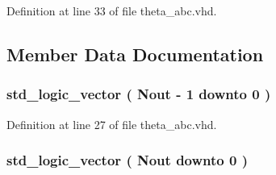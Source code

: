 Definition at line 33 of file theta\+\_\+abc.\+vhd.



\subsection{Member Data Documentation}
\hypertarget{classtheta__abc_1_1theta__abc_ad76995fdeaec7ada621075ea6562c673}{}
\subsubsection[{th\+\_\+a}]{ {\bfseries \textcolor{comment}{std\+\_\+logic\+\_\+vector}\textcolor{vhdlchar}{ }\textcolor{vhdlchar}{(}\textcolor{vhdlchar}{ }\textcolor{vhdlchar}{ }\textcolor{vhdlchar}{ }\textcolor{vhdlchar}{ }{\bfseries {\bf Nout}} \textcolor{vhdlchar}{-\/}\textcolor{vhdlchar}{ } \textcolor{vhdldigit}{1} \textcolor{vhdlchar}{ }\textcolor{keywordflow}{downto}\textcolor{vhdlchar}{ }\textcolor{vhdlchar}{ } \textcolor{vhdldigit}{0} \textcolor{vhdlchar}{ }\textcolor{vhdlchar}{)}\textcolor{vhdlchar}{ }} \hspace{0.3cm}{\ttfamily [Signal]}}\label{classtheta__abc_1_1theta__abc_ad76995fdeaec7ada621075ea6562c673}


Definition at line 27 of file theta\+\_\+abc.\+vhd.

\hypertarget{classtheta__abc_1_1theta__abc_aa089585a137a873b884793531ca5edc0}{}
\subsubsection[{th\+\_\+ai}]{ {\bfseries \textcolor{comment}{std\+\_\+logic\+\_\+vector}\textcolor{vhdlchar}{ }\textcolor{vhdlchar}{(}\textcolor{vhdlchar}{ }\textcolor{vhdlchar}{ }\textcolor{vhdlchar}{ }\textcolor{vhdlchar}{ }{\bfseries {\bf Nout}} \textcolor{vhdlchar}{ }\textcolor{keywordflow}{downto}\textcolor{vhdlchar}{ }\textcolor{vhdlchar}{ } \textcolor{vhdldigit}{0} \textcolor{vhdlchar}{ }\textcolor{vhdlchar}{)}\textcolor{vhdlchar}{ }} \hspace{0.3cm}{\ttfamily [Signal]}}\label{classtheta__abc_1_1theta__abc_aa089585a137a873b884793531ca5edc0}


